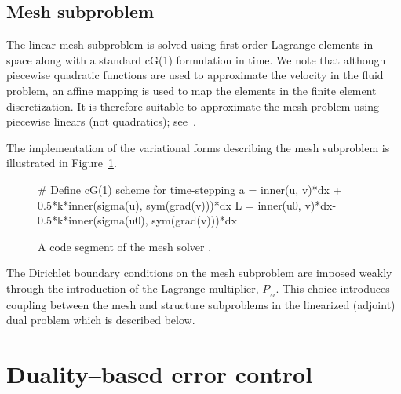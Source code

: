 \subsection{Mesh subproblem}

The linear mesh subproblem is solved using first order Lagrange
elements in space along with a standard cG(1) formulation in time. We
note that although piecewise quadratic functions are used to
approximate the velocity in the fluid problem, an affine mapping is
used to map the elements in the finite element discretization. It is
therefore suitable to approximate the mesh problem using piecewise
linears (not quadratics); see~\citet{FormaggiaNobile1999}.

The implementation of the variational forms describing the mesh
subproblem is illustrated in Figure~\ref{selim:fig:meshsolver}.
\begin{figure}[tbp!]
\begin{python}
# Define cG(1) scheme for time-stepping
a = inner(u, v)*dx + 0.5*k*inner(sigma(u), sym(grad(v)))*dx
L = inner(u0, v)*dx-0.5*k*inner(sigma(u0), sym(grad(v)))*dx
\end{python}
\caption{A code segment of the mesh solver .}
\label{selim:fig:meshsolver}
\end{figure}
The Dirichlet boundary conditions on the mesh subproblem are imposed
weakly through the introduction of the Lagrange multiplier,
$P_{_{M}}$. This choice introduces coupling between the mesh and
structure subproblems in the linearized (adjoint) dual problem which
is described below.

\section{Duality--based error control}

